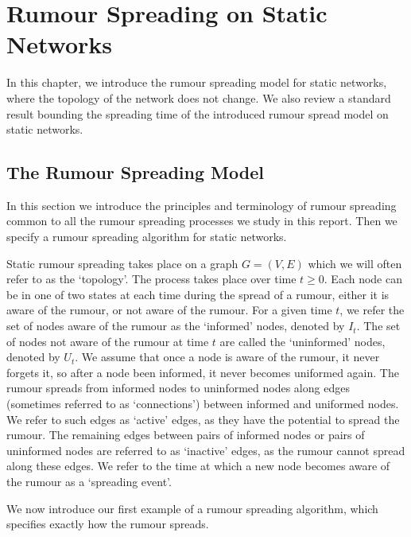 \chapter{Rumour Spreading on Static Networks}\label{chapter:staticIntro}

In this chapter, we introduce the rumour spreading model for static networks, where the topology of the network does not change. We also review a standard result bounding the spreading time of the introduced rumour spread model on static networks.

\section{The Rumour Spreading Model}

In this section we introduce the principles and terminology of rumour spreading common to all the rumour spreading processes we study in this report. Then we specify a rumour spreading algorithm for static networks.

Static rumour spreading takes place on a graph $G=(V,E)$ which we will often refer to as the `topology'. The process takes place over time $t \geq 0$. Each node can be in one of two states at each time during the spread of a rumour, either it is aware of the rumour, or not aware of the rumour. For a given time $t$, we refer the set of nodes aware of the rumour as the `informed' nodes, denoted by $I_t$. The set of nodes not aware of the rumour at time $t$ are called the `uninformed' nodes, denoted by $U_t$. We assume that once a node is aware of the rumour, it never forgets it, so after a node been informed, it never becomes uniformed again. The rumour spreads from informed nodes to uninformed nodes along edges (sometimes referred to as `connections') between informed and uniformed nodes. We refer to such edges as `active' edges, as they have the potential to spread the rumour. The remaining edges between pairs of informed nodes or pairs of uninformed nodes are referred to as `inactive' edges, as the rumour cannot spread along these edges. We refer to the time at which a new node becomes aware of the rumour as a `spreading event'.

We now introduce our first example of a rumour spreading algorithm, which specifies exactly how the rumour spreads.  


